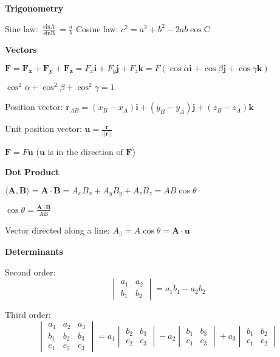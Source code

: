 \documentclass[twocolumn]{article}
\begin{document}
\small

\textbf{Trigonometry}

Sine law: $\frac{\sin \text{A}}{\sin \text{B}} = \frac{a}{b}$ \hfill Cosine law: $c^2 = a^2 + b^2 - 2ab \cos \text{C}$

\dotfill

\textbf{Vectors}

$\mathbf{F} = \mathbf{F_x} + \mathbf{F_y} + \mathbf{F_z} = F_x \mathbf{i} + F_y \mathbf{j} + F_z \mathbf{k} = F (\cos \alpha \mathbf{i} + \cos \beta \mathbf{j} + \cos \gamma \mathbf{k})$

$\cos^2 \alpha + \cos^2 \beta + \cos^2 \gamma = 1$

Position vector: $\mathbf{r}_{AB} = (x_B - x_A) \mathbf{i} + (y_B - y_A) \mathbf{j} + (z_B - z_A) \mathbf{k}$

Unit position vector: $\mathbf{u} = \frac{\mathbf{r}}{|| \mathbf{r} ||}$

$\mathbf{F} = F \mathbf{u}$ \hfill ($\mathbf{u}$ is in the direction of $\mathbf{F}$)

\dotfill

\textbf{Dot Product}

$\langle \textbf{A}, \textbf{B} \rangle = \mathbf{A} \cdot \mathbf{B} = A_x B_x + A_y B_y + A_z B_z = AB \cos \theta$

$\cos \theta = \frac{\mathbf{A} \cdot \mathbf{B}}{\text{AB}}$

Vector directed along a line: $A_{||} = A \cos \theta = \mathbf{A} \cdot \mathbf{u}$

\dotfill

\textbf{Determinants}

Second order:
\begin{equation*}
    \begin{vmatrix}
        a_1 & a_2 \\
        b_1 & b_2
    \end{vmatrix} = a_1 b_1 - a_2 b_2
\end{equation*}

Third order:
\begin{equation*}
    \begin{vmatrix}
        a_1 & a_2 & a_3 \\
        b_1 & b_2 & b_3 \\
        c_1 & c_2 & c_3
    \end{vmatrix}
    = a_1 \begin{vmatrix}
        b_2 & b_3 \\
        c_2 & c_3
    \end{vmatrix}
    - a_2 \begin{vmatrix}
        b_1 & b_3 \\
        c_1 & c_3
    \end{vmatrix}
    + a_3 \begin{vmatrix}
        b_1 & b_2 \\
        c_1& c_2
    \end{vmatrix}
\end{equation*}
\end{document}
